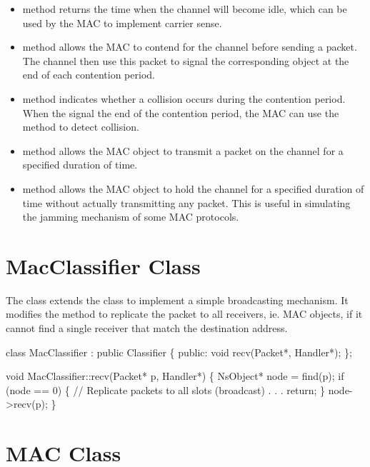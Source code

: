 \begin{itemize}
\item  {} method returns the time when the channel will become
idle, which can be used by the MAC to implement carrier sense.
\item  {} method allows the MAC to contend for the channel
before sending a packet.  The channel then use this packet to signal the
corresponding  object at the end of each contention period.
\item  {} method indicates whether a collision occurs
during the contention period.  When the  signal the end of
the contention period, the MAC can use the  method to
detect collision.
\item  {} method allows the MAC object to transmit a packet on the
channel for a specified duration of time.
\item  {} method allows the MAC object to hold the channel for a
specified duration of time without actually transmitting any packet.
This is useful in simulating the jamming mechanism of some MAC
protocols.
\end{itemize}

\section{MacClassifier Class}
\label{sec:mac_classifier}

The  class extends the  class to
implement a simple broadcasting mechanism.  It modifies the
 method to replicate the packet to all receivers, ie. MAC
objects, if it cannot find a single receiver that match the destination
address.

\begin{program}
    class MacClassifier : public Classifier \{
    public:
        void recv(Packet*, Handler*);
    \};

    void MacClassifier::recv(Packet* p, Handler*)
    \{
        NsObject* node = find(p);
        if (node == 0) \{
                // Replicate packets to all slots (broadcast)
                . . .
                return;
        \}
        node->recv(p);
    \}
\end{program}


\section{MAC Class}
\label{sec:mac}

